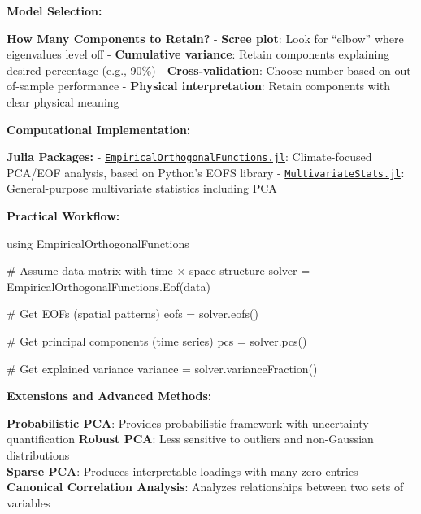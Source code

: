 \documentclass[
  letterpaper,
  DIV=11,
  numbers=noendperiod]{scrreprt}
\newenvironment{Shaded}{\begin{snugshade}}{\end{snugshade}}
\newcommand{\BuiltInTok}[1]{\textcolor[rgb]{0.00,0.23,0.31}{#1}}
\newcommand{\CommentTok}[1]{\textcolor[rgb]{0.37,0.37,0.37}{#1}}
\newcommand{\FunctionTok}[1]{\textcolor[rgb]{0.28,0.35,0.67}{#1}}
\newcommand{\ImportTok}[1]{\textcolor[rgb]{0.00,0.46,0.62}{#1}}
\newcommand{\NormalTok}[1]{\textcolor[rgb]{0.00,0.23,0.31}{#1}}
\newcommand{\OperatorTok}[1]{\textcolor[rgb]{0.37,0.37,0.37}{#1}}
\begin{document}
\textbf{Model Selection:}

\textbf{How Many Components to Retain?} - \textbf{Scree plot}: Look for
``elbow'' where eigenvalues level off - \textbf{Cumulative variance}:
Retain components explaining desired percentage (e.g., 90\%) -
\textbf{Cross-validation}: Choose number based on out-of-sample
performance - \textbf{Physical interpretation}: Retain components with
clear physical meaning

\textbf{Computational Implementation:}

\textbf{Julia Packages:} -
\href{https://kmarkert.github.io/EmpiricalOrthogonalFunctions.jl/dev/}{\texttt{EmpiricalOrthogonalFunctions.jl}}:
Climate-focused PCA/EOF analysis, based on Python's EOFS library -
\href{https://juliastats.org/MultivariateStats.jl/dev/pca/}{\texttt{MultivariateStats.jl}}:
General-purpose multivariate statistics including PCA

\textbf{Practical Workflow:}

\begin{Shaded}
\begin{Highlighting}[]
\ImportTok{using} \BuiltInTok{EmpiricalOrthogonalFunctions}

\CommentTok{\# Assume data matrix with time × space structure}
\NormalTok{solver }\OperatorTok{=}\NormalTok{ EmpiricalOrthogonalFunctions.}\FunctionTok{Eof}\NormalTok{(data)}

\CommentTok{\# Get EOFs (spatial patterns)}
\NormalTok{eofs }\OperatorTok{=}\NormalTok{ solver.}\FunctionTok{eofs}\NormalTok{()}

\CommentTok{\# Get principal components (time series)  }
\NormalTok{pcs }\OperatorTok{=}\NormalTok{ solver.}\FunctionTok{pcs}\NormalTok{()}

\CommentTok{\# Get explained variance}
\NormalTok{variance }\OperatorTok{=}\NormalTok{ solver.}\FunctionTok{varianceFraction}\NormalTok{()}
\end{Highlighting}
\end{Shaded}

\textbf{Extensions and Advanced Methods:}

\textbf{Probabilistic PCA}: Provides probabilistic framework with
uncertainty quantification \textbf{Robust PCA}: Less sensitive to
outliers and non-Gaussian distributions\\
\textbf{Sparse PCA}: Produces interpretable loadings with many zero
entries \textbf{Canonical Correlation Analysis}: Analyzes relationships
between two sets of variables
\end{document}
